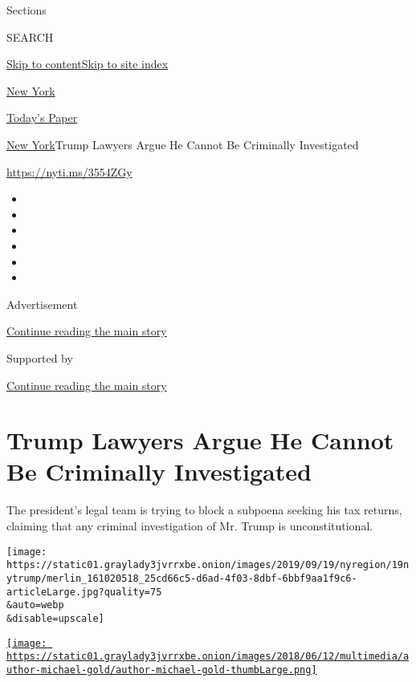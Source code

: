 Sections

SEARCH

\protect\hyperlink{site-content}{Skip to
content}\protect\hyperlink{site-index}{Skip to site index}

\href{https://www.nytimes3xbfgragh.onion/section/nyregion}{New York}

\href{https://myaccount.nytimes3xbfgragh.onion/auth/login?response_type=cookie\&client_id=vi}{}

\href{https://www.nytimes3xbfgragh.onion/section/todayspaper}{Today's
Paper}

\href{/section/nyregion}{New York}\textbar{}Trump Lawyers Argue He
Cannot Be Criminally Investigated

\url{https://nyti.ms/3554ZGy}

\begin{itemize}
\item
\item
\item
\item
\item
\item
\end{itemize}

Advertisement

\protect\hyperlink{after-top}{Continue reading the main story}

Supported by

\protect\hyperlink{after-sponsor}{Continue reading the main story}

\hypertarget{trump-lawyers-argue-he-cannot-be-criminally-investigated}{%
\section{Trump Lawyers Argue He Cannot Be Criminally
Investigated}\label{trump-lawyers-argue-he-cannot-be-criminally-investigated}}

The president's legal team is trying to block a subpoena seeking his tax
returns, claiming that any criminal investigation of Mr. Trump is
unconstitutional.

\texttt{[image: https://static01.graylady3jvrrxbe.onion/images/2019/09/19/nyregion/19nytrump/merlin\_161020518\_25cd66c5-d6ad-4f03-8dbf-6bbf9aa1f9c6-articleLarge.jpg?quality=75\\\&auto=webp\\\&disable=upscale]}

\href{https://www.nytimes3xbfgragh.onion/by/michael-gold}{\texttt{[image: https://static01.graylady3jvrrxbe.onion/images/2018/06/12/multimedia/author-michael-gold/author-michael-gold-thumbLarge.png]}}

